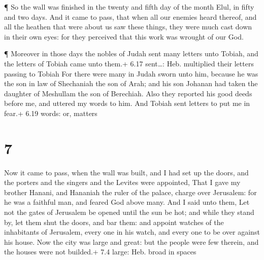  ¶ So the wall was finished in the twenty and fifth day of
the month Elul, in fifty and two days.  And it came to
pass, that when all our enemies heard thereof, and all the heathen that
were about us saw these things, they were much cast down in their own
eyes: for they perceived that this work was wrought of our God.

 ¶ Moreover in those days the nobles of Judah sent many
letters unto Tobiah, and the letters of Tobiah came unto them.+ 6.17
sent\ldots: Heb. multiplied their letters passing to Tobiah
 For there were many in Judah sworn unto him, because he
was the son in law of Shechaniah the son of Arah; and his son Johanan
had taken the daughter of Meshullam the son of Berechiah. 
Also they reported his good deeds before me, and uttered my words to
him. And Tobiah sent letters to put me in fear.+ 6.19 words: or, matters

\hypertarget{section-6}{%
\section{7}\label{section-6}}

 Now it came to pass, when the wall was built, and I had set
up the doors, and the porters and the singers and the Levites were
appointed,  That I gave my brother Hanani, and Hananiah the
ruler of the palace, charge over Jerusalem: for he was a faithful man,
and feared God above many.  And I said unto them, Let not
the gates of Jerusalem be opened until the sun be hot; and while they
stand by, let them shut the doors, and bar them: and appoint watches of
the inhabitants of Jerusalem, every one in his watch, and every one to
be over against his house.  Now the city was large and
great: but the people were few therein, and the houses were not
builded.+ 7.4 large: Heb. broad in spaces


